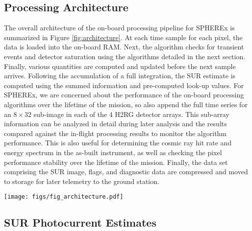 \documentclass{ws-jai}
\begin{document}
\subsection{Processing Architecture}
\label{sS:dataarchitecture}

The overall architecture of the on-board processing pipeline for
SPHEREx is summarized in Figure \ref{fig:architecture}.  At each time
sample for each pixel, the data is loaded into the on-board RAM.
Next, the algorithm checks for transient events and detector
saturation using the algorithms detailed in the next section.
Finally, various quantities are computed and updated before the next
sample arrives.  Following the accumulation of a full integration, the
SUR estimate is computed using the summed information and pre-computed
look-up values.  For SPHEREx, we are concerned about the performance
of the on-board processing algorithms over the lifetime of the
mission, so also append the full time series for an $8 \times 32$
sub-image in each of the 4 H2RG detector arrays.  This sub-array
information can be analyzed in detail during later analysis and the
results compared against the in-flight processing results to monitor
the algorithm performance.  This is also useful for determining the
cosmic ray hit rate and energy spectrum in the as-built instrument, as
well as checking the pixel performance stability over the lifetime of
the mission.  Finally, the data set comprising the SUR image, flags,
and diagnostic data are compressed and moved to storage for later
telemetry to the ground station.

\begin{figure*}[ht!]
\centering
\texttt{[image: figs/fig\_architecture.pdf]}
\caption{On-board data processing flow for SPHEREx.  For each
  detector, data is sampled from the H2RG using 32 output channels and
  loaded into RAM on the processing board.  At each time step, we
  check and flag for time stream transient events and pixel
  reciprocity failure before accumulating various quantities (see
  Section \ref{sS:SUR}).  At the end of each integration, these
  quantities are then used to build optimal estimates for the
  photocurrent in each detector.  A $8 \times 32$ pixel sub-array
  sampled at full time resolution is appended to the image and flag
  data, which are then compressed.  These are then shifted to a
  storage volume for later transmission to the ground
  station. \label{fig:architecture} }
\end{figure*}

\subsection{SUR Photocurrent Estimates}
\label{sS:SUR}
\end{document}
